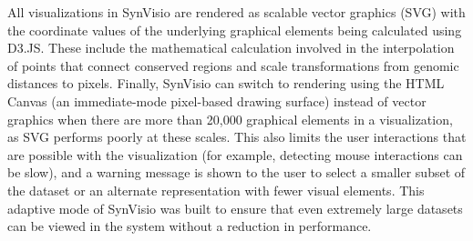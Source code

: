 All visualizations in SynVisio are rendered as scalable vector graphics (SVG) with the coordinate values of the underlying graphical elements being calculated using D3.JS. These include the mathematical calculation involved in the interpolation of points that connect conserved regions and scale transformations from genomic distances to pixels. Finally, SynVisio can switch to rendering using the HTML Canvas (an immediate-mode pixel-based drawing surface) instead of vector graphics when there are more than 20,000 graphical elements in a visualization, as SVG performs poorly at these scales. This also limits the user interactions that are possible with the visualization (for example, detecting mouse interactions can be slow), and a warning message is shown to the user to select a smaller subset of the dataset or an alternate representation with fewer visual elements. This adaptive mode of SynVisio was built to ensure that even extremely large datasets can be viewed in the system without a reduction in performance.

